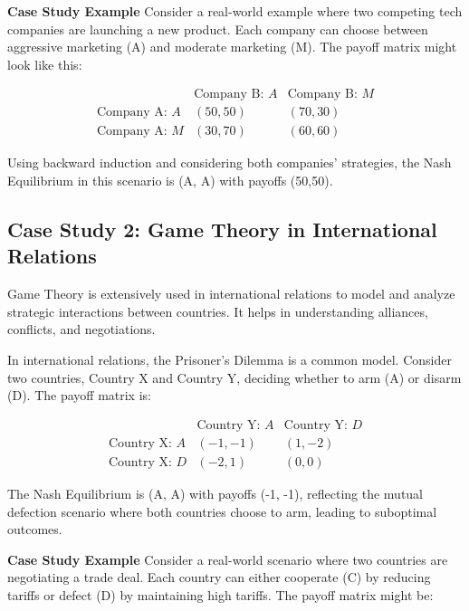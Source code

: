 \documentclass[12pt]{book} %
\begin{document}
\textbf{Case Study Example}
Consider a real-world example where two competing tech companies are launching a new product. Each company can choose between aggressive marketing (A) and moderate marketing (M). The payoff matrix might look like this:

\begin{equation}
\begin{array}{c|cc}
 & \text{Company B: } A & \text{Company B: } M \\
\hline
\text{Company A: } A & (50,50) & (70,30) \\
\text{Company A: } M & (30,70) & (60,60)
\end{array}
\end{equation}

Using backward induction and considering both companies' strategies, the Nash Equilibrium in this scenario is (A, A) with payoffs (50,50).

\subsection{Case Study 2: Game Theory in International Relations}
Game Theory is extensively used in international relations to model and analyze strategic interactions between countries. It helps in understanding alliances, conflicts, and negotiations.

In international relations, the Prisoner's Dilemma is a common model. Consider two countries, Country X and Country Y, deciding whether to arm (A) or disarm (D). The payoff matrix is:

\begin{equation}
\begin{array}{c|cc}
 & \text{Country Y: } A & \text{Country Y: } D \\
\hline
\text{Country X: } A & (-1,-1) & (1,-2) \\
\text{Country X: } D & (-2,1) & (0,0)
\end{array}
\end{equation}

The Nash Equilibrium is (A, A) with payoffs (-1, -1), reflecting the mutual defection scenario where both countries choose to arm, leading to suboptimal outcomes.

\textbf{Case Study Example}
Consider a real-world scenario where two countries are negotiating a trade deal. Each country can either cooperate (C) by reducing tariffs or defect (D) by maintaining high tariffs. The payoff matrix might be:
\end{document}
